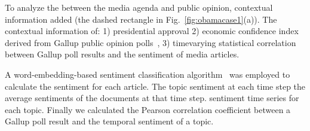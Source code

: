 To analyze the  between the media agenda and public opinion,   contextual information  added (the dashed rectangle in Fig.~\ref{fig:obamacase1}(a)).
The contextual information  of: 1)  presidential approval \kg{,} 2)  economic confidence index derived from Gallup public opinion polls~\cite{Gallup}, 
3)  time\kg{-}varying statistical correlation between  Gallup poll results and the sentiment of media articles.

A word-embedding-based sentiment classification algorithm~\cite{Tang2014} was employed to calculate the sentiment for each article.
The topic sentiment at each time step  the average sentiments of the documents at that time step.
 sentiment time series  for each topic.
Finally we calculated the Pearson correlation coefficient between a Gallup poll result and the temporal sentiment of a topic.


